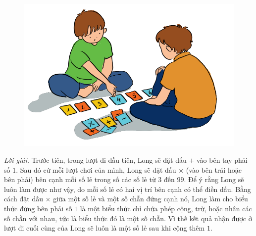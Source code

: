 \begin{multicols}{2}
	\begin{figure}[H]
		\centering
		\vspace*{-5pt}
		\captionsetup{labelformat= empty, justification=centering}
		\includegraphics[width=0.7\linewidth]{Pi9_bai6}
		\vspace*{-5pt}
	\end{figure}
	\textit{Lời giải.} 	Trước tiên, trong lượt đi đầu tiên, Long sẽ đặt dấu $+$ vào bên tay phải số $1$. Sau đó cứ mỗi lượt chơi của mình, Long sẽ đặt dấu $\times$ (vào bên trái hoặc bên phải) bên cạnh mỗi số lẻ trong số các số lẻ từ $3$ đến $99$. Để ý rằng Long sẽ luôn làm được như vậy, do mỗi số lẻ có hai vị trí bên cạnh có thể điền dấu. Bằng cách đặt dấu $\times$ giữa một số lẻ và một số chẵn đứng cạnh nó, Long làm cho biểu thức đứng bên phải số $1$ là một biểu thức chỉ chứa phép cộng, trừ, hoặc nhân các số chẵn với nhau, tức là biểu thức đó là một số chẵn. Vì thế kết quả nhận được ở lượt đi cuối cùng của Long sẽ luôn là một số lẻ sau khi cộng thêm $1$. 
\end{multicols}
\newpage
\graphicspath{{../toancuabi/toantienganh/}}
\begingroup
\thispagestyle{toancuabinone}
